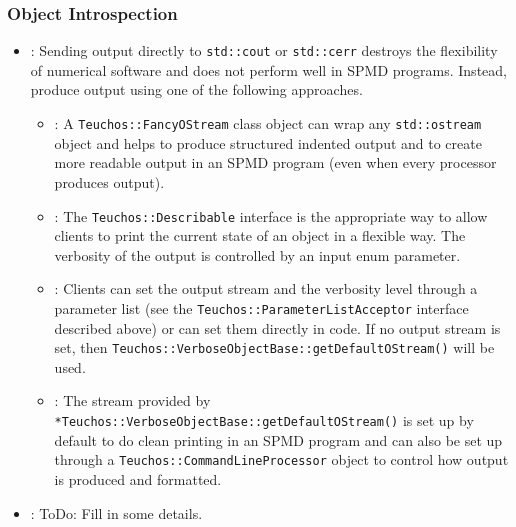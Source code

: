 %
\subsubsection{Object Introspection}
%


\begin{itemize}


{}\item\GCGStdStream: Sending output directly to {}\texttt{std\-::cout} or
{}\texttt{std\-::cerr} destroys the flexibility of numerical software and does
not perform well in SPMD programs.  Instead, produce output using one of the
following approaches.

  \begin{itemize}
  
  {}\item\GCGTeuchosFancyOStream: A {}\texttt{Teuchos\-::Fancy\-OStream} class
  object can wrap any {}\texttt{std\-::ostream} object and helps to produce
  structured indented output and to create more readable output in an SPMD
  program (even when every processor produces output).
  
  
  {}\item\GCGTeuchosDescribable: The {}\texttt{Teuchos\-::Describable} interface
  is the appropriate way to allow clients to print the current state of an
  object in a flexible way.  The verbosity of the output is controlled by an
  input enum parameter.
  
  
  {}\item\GCGTeuchosVerboseObject: Clients can set the output stream and the
  verbosity level through a parameter list (see the
  {}\texttt{Teuchos\-::ParameterListAcceptor} interface described above) or can
  set them directly in code.  If no output stream is set, then
  {}\texttt{Teuchos\-::Verbose\-Object\-Base\-::get\-Default\-OStream()} will be
  used.
  
  
  {}\item\GCGTeuchosVerboseObjectBaseDefaultOStream: The stream provided by
  {}\texttt{*Teuchos\-::Verbose\-Object\-Base\-::get\-Default\-OStream()} is set
  up by default to do clean printing in an SPMD program and can also be set up
  through a {}\texttt{Teuchos\-::Command\-Line\-Processor} object to control how
  output is produced and formatted.

  \end{itemize}


  {}\item\GCGTeuchosTimers: ToDo: Fill in some details.


\end{itemize}


